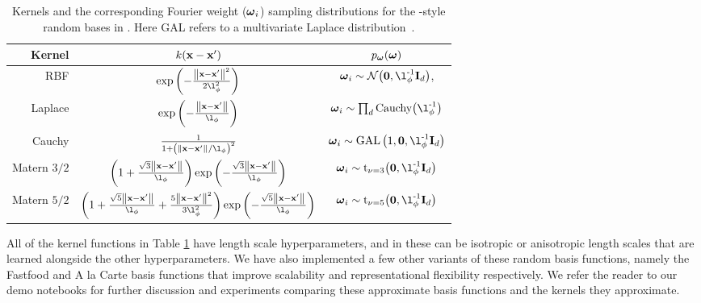 \documentclass[11pt, oneside]{article}
\begin{document}
\begin{table}[htb]

    \centering

    \caption{Kernels and the corresponding Fourier weight ($\boldsymbol{\omega}_i$)
        sampling distributions for the \citet{rahimi2007}-style random bases in
        \revrand. Here GAL refers to a multivariate Laplace
        distribution~\cite{kozubowski2013multivariate}.}

    \begin{tabular}{r|c c}
        \textbf{Kernel} & $k\!\left({\mathbf{x} - \mathbf{x}'}\right)$
        & $p_{\boldsymbol{\omega}}(\boldsymbol{\omega})$ \\
        \hline
        RBF &
        $\exp\brac{-\frac{\lnorm{}{\inss - \inssprime}^2}{2\lenscale^2}}$ &
            $\ffourier_i \sim \gaus{\mathbf{0}, \lenscale\inv\ident{d}}$, \\
        Laplace & $\exp\brac{-\frac{\lnorm{}{\inss-\inssprime}}{\lenscale}}$ &
            $\ffourier_i \sim \prod_d \text{Cauchy}\!\brac{\lenscale\inv}$ \\
        Cauchy &
            $\frac{1}{1+\brac{\lnorm{}{\inss-\inssprime}/\lenscale}^2}$ & 
            $\ffourier_i \sim \text{GAL}\brac{1, \mathbf{0},
                \lenscale\inv\ident{d}}$ \\
        Matern $3/2$ & 
            $\brac{1 + \frac{\sqrt{3}\lnorm{}{\inss-\inssprime}}{\lenscale}}
            \exp\brac{-\frac{\sqrt{3}\lnorm{}{\inss-\inssprime}}{\lenscale}}$ & 
            $\ffourier_i \sim 
            \text{t}_{\nu=3}\!\brac{\mathbf{0}, \lenscale\inv\ident{d}}$ \\
        Matern $5/2$ &
            $\brac{1 + \frac{\sqrt{5}\lnorm{}{\inss-\inssprime}}{\lenscale} + 
                \frac{5\lnorm{}{\inss - \inssprime}^2}{3\lenscale^2}}
            \exp\brac{-\frac{\sqrt{5}\lnorm{}{\inss-\inssprime}}{\lenscale}}$ & 
            $\ffourier_i \sim 
            \text{t}_{\nu=5}\!\brac{\mathbf{0}, \lenscale\inv\ident{d}}$ \\
        \hline
    \end{tabular}

    \label{tab:randommappings}

\end{table}

All of the kernel functions in Table \ref{tab:randommappings} have length scale
hyperparameters, and in \revrand these can be isotropic or anisotropic
length scales that are learned alongside the other hyperparameters. We have
also implemented a few other variants of these random basis functions, namely
the Fastfood \citep{le2013fastfood} and A la Carte \citep{yang2014} basis
functions that improve scalability and representational flexibility
respectively. We refer the reader to our demo notebooks for further discussion
and experiments comparing these approximate basis functions and the kernels
they approximate.
\end{document}
